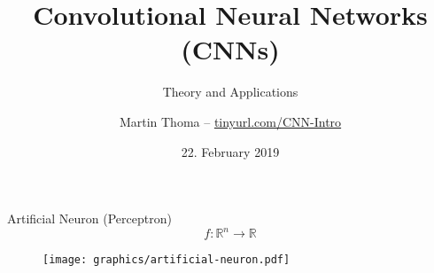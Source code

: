 \documentclass{beamer}
\begin{document}
\title{Convolutional Neural Networks (CNNs)}
\subtitle{Theory and Applications}
\author{Martin Thoma -- \footnotesize \href{http://tinyurl.com/CNN-Intro}{tinyurl.com/CNN-Intro}}
\date{22. February 2019}
\subject{Machine Learning, AI, Neural Networks, Convolutional Neural Networks}

\frame{\titlepage}

\begin{frame}{Artificial Neuron (Perceptron)}
    $$f: \mathbb{R}^n \rightarrow \mathbb{R}$$
    \begin{figure}[ht]
        \centering
        \texttt{[image: graphics/artificial-neuron.pdf]}
    \end{figure}
\end{frame}
\end{document}
